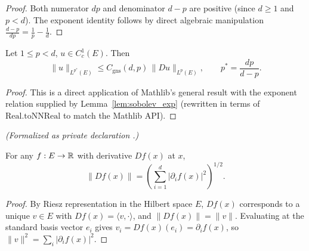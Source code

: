 \begin{proof}
\leanok

Both numerator $dp$ and denominator $d - p$ are positive (since $d \ge 1$ and
$p < d$). The exponent identity follows by direct algebraic manipulation
$\frac{d - p}{dp} = \frac{1}{p} - \frac{1}{d}$.
\end{proof}

\begin{theorem}
\label{thm:sobolev_smooth}
\leanok
{}
Let $1 \le p < d$, $u \in C_c^1(E)$. Then
\begin{equation*}
  \|u\|_{L^{p^*}(E)} \le C_{\mathrm{gns}}(d, p)\,\|Du\|_{L^p(E)},
  \qquad p^* = \frac{dp}{d-p}.
\end{equation*}
\end{theorem}

\begin{proof}
\leanok
{}

This is a direct application of Mathlib's general result
 with the exponent
relation supplied by Lemma~\ref{lem:sobolev_exp} (rewritten in terms of
$\mathrm{Real.toNNReal}$ to match the Mathlib API).
\end{proof}

\begin{lemma}
\label{lem:norm_fderiv}
\leanok
\noindent\textit{(Formalized as private declaration .)}\par
For any $f : E \to \mathbb{R}$ with derivative $Df(x)$ at $x$,
\begin{equation*}
  \|Df(x)\|
   = \left(\sum_{i=1}^d |\partial_i f(x)|^2\right)^{1/2}.
\end{equation*}
\end{lemma}

\begin{proof}
\leanok

By Riesz representation in the Hilbert space $E$, $Df(x)$ corresponds to a
unique $v \in E$ with $Df(x) = \langle v, \cdot\rangle$, and $\|Df(x)\| = \|v\|$.
Evaluating at the standard basis vector $e_i$ gives $v_i = Df(x)(e_i) =
\partial_i f(x)$, so $\|v\|^2 = \sum_i |\partial_i f(x)|^2$.
\end{proof}

